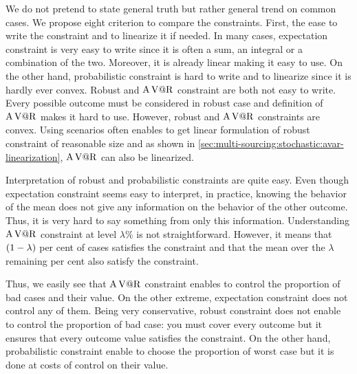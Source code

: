 
We do not pretend to state general truth but rather general trend on common cases.
We propose eight criterion to compare the constraints.
First, the ease to write the constraint and to linearize it if needed.
In many cases, expectation constraint is very easy to write since it is often a sum, an integral or a combination of the two.
Moreover, it is already linear making it easy to use.
On the other hand, probabilistic constraint is hard to write and to linearize since it is hardly ever convex.
Robust and $\operatorname{A\operatorname{V@R}}$ constraint are both not easy to write.
Every possible outcome must be considered in robust case and definition of $\operatorname{A\operatorname{V@R}}$ makes it hard to use.
However, robust and $\operatorname{A\operatorname{V@R}}$ constraints are convex.
Using scenarios often enables to get linear formulation of robust constraint of reasonable size and as shown in \cref{sec:multi-sourcing:stochastic:avar-linearization}, $\operatorname{A\operatorname{V@R}}$ can also be linearized.


Interpretation of robust and probabilistic constraints are quite easy. 
Even though expectation constraint seems easy to interpret, in practice, knowing the behavior of the mean does not give any information on the behavior of the other outcome.
Thus, it is very hard to say something from only this information.
Understanding $\operatorname{A\operatorname{V@R}}$ constraint at level $\lambda\%$ is not straightforward.
However, it means that $\bracket{1-\lambda}$ per cent of cases satisfies the constraint and that the mean over the $\lambda$ remaining per cent also satisfy the constraint.


Thus, we easily see that $\operatorname{A\operatorname{V@R}}$ constraint enables to control the proportion of bad cases and their value.
On the other extreme, expectation constraint does not control any of them.
Being very conservative, robust constraint does not enable to control the proportion of bad case: you must cover every outcome but it ensures that every outcome value satisfies the constraint.
On the other hand, probabilistic constraint enable to choose the proportion of worst case but it is done at costs of control on their value.


